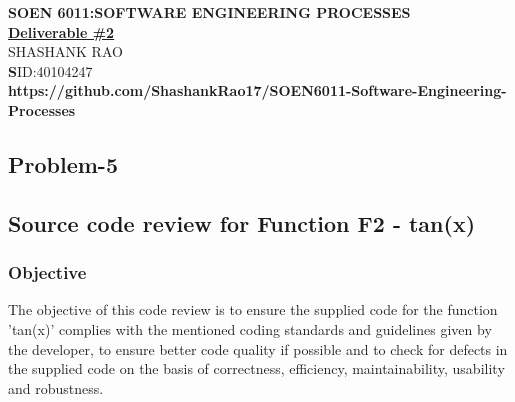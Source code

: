 \documentclass[12pt]{report}
\begin{document}
\begin{center}
	\large\textbf{SOEN 6011:SOFTWARE ENGINEERING PROCESSES}\\
	\vspace{0.05cm}\large\textbf{\underline{Deliverable \#2}}\\
	\vspace{0.05cm}\small{SHASHANK RAO}\\
	\small\textbf SID:40104247\\

	\vspace{0.10cm}\small\textbf{https://github.com/ShashankRao17/SOEN6011-Software-Engineering-Processes}
	
\end{center}

\renewcommand \thesection{\arabic{section}}
\renewcommand \thesubsection{\arabic{section}.\arabic{subsection}}

\begin{center}
	\section{Problem-5}
\end{center}

\subsection{Source code review for Function F2 - tan(x)}
	\subsubsection{Objective}The objective of this code review is to ensure the supplied code for the function 'tan(x)' complies with the mentioned coding standards and guidelines given by the developer, to ensure better code quality if possible and to check for defects in the supplied code on the basis of correctness, efficiency, maintainability, usability and robustness.
\end{document}
